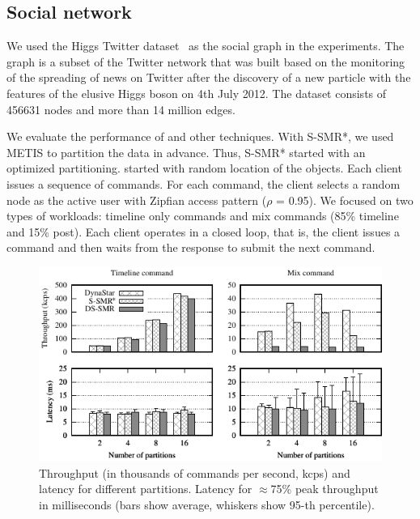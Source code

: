 \subsection{Social network}

We used the Higgs Twitter dataset~\cite{snapnets} as the social graph in the experiments. 
The graph is a subset of the Twitter network that was built based on the monitoring of the spreading
of news on Twitter after the discovery of a new particle with the features of the elusive 
Higgs boson on 4th July 2012. The dataset consists of 456631 nodes and more than 14 million edges.

We evaluate the performance of \dynastar and other techniques. With S-SMR*, we used
METIS to partition the data in advance. Thus, S-SMR* started with an optimized partitioning. \dynastar started with
random location of the objects. Each client issues a sequence of commands.  
For each command, the client selects a random node as the active user with Zipfian access pattern ($\rho$ = 0.95).
We focused on two types of workloads: timeline only commands and mix commands (85\% timeline and 15\% post). 
Each client operates in a closed loop, that is, the client issues a command and then waits from the response to submit the next command.


%
\begin{figure}[ht]
 \includegraphics[width=0.99\columnwidth]{figures/experiments/chirper-compare-full}
 \caption{Throughput (in thousands of commands per second, kcps) and latency for different partitions. 
  Latency for $\approx$75\% peak throughput in milliseconds (bars show average, whiskers show 95-th percentile).}
  \label{fig:socialscalability}
\end{figure}

